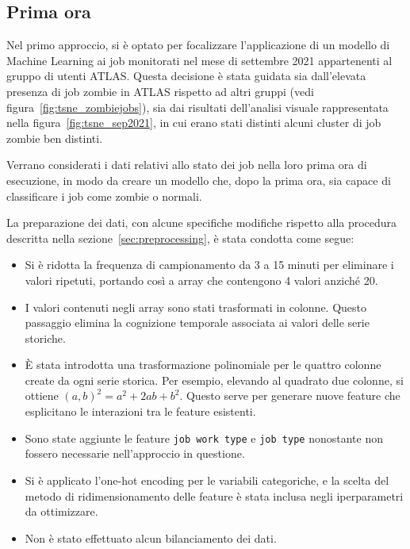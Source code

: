 \subsection{Prima ora}

Nel primo approccio, si è optato per focalizzare l'applicazione di un modello
di Machine Learning ai job monitorati nel mese di settembre 2021 appartenenti
al gruppo di utenti ATLAS. Questa decisione è stata guidata sia dall'elevata
presenza di job zombie in ATLAS rispetto ad altri gruppi (vedi
figura~\ref{fig:tsne_zombiejobs}), sia dai risultati dell'analisi visuale
rappresentata nella figura~\ref{fig:tsne_sep2021}, in cui erano stati distinti
alcuni cluster di job zombie ben distinti. 

Verrano considerati i dati relativi allo stato dei job nella loro prima ora di
esecuzione, in modo da creare un modello che, dopo la prima ora, sia capace di
classificare i job come zombie o normali. 

La preparazione dei dati, con alcune specifiche modifiche rispetto alla
procedura descritta nella sezione~\ref{sec:preprocessing}, è stata condotta
come segue:

\begin{itemize}
    \item Si è ridotta la frequenza di campionamento da 3 a 15 minuti per
        eliminare i valori ripetuti, portando così a array che contengono 4
        valori anziché 20.
    \item I valori contenuti negli array sono stati trasformati in colonne.
        Questo passaggio elimina la cognizione temporale associata ai valori
        delle serie storiche.
    \item È stata introdotta una trasformazione polinomiale per le quattro
        colonne create da ogni serie storica. Per esempio, elevando al
        quadrato due colonne, si ottiene $(a,b)^2=a^2+2ab+b^2$. Questo serve
        per generare nuove feature che esplicitano le interazioni tra le
        feature esistenti.
    \item Sono state aggiunte le feature \verb|job work type| e \verb|job type| 
        nonostante non fossero necessarie nell'approccio in questione.
    \item Si è applicato l'one-hot encoding per le variabili categoriche, e la
        scelta del metodo di ridimensionamento delle feature è stata inclusa
        negli iperparametri da ottimizzare.
    \item Non è stato effettuato alcun bilanciamento dei dati.
\end{itemize}

